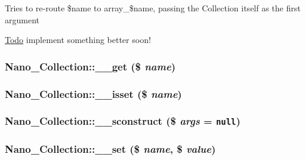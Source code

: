 Tries to re-route \$name to array\_\-\$name, passing the Collection itself as the first argument \begin{Desc}
\item[\hyperlink{todo__todo000002}{Todo}]implement something better soon! \end{Desc}
\hypertarget{classNano__Collection_0fed66ab270585399fffb03d9421b05c}{
\subsubsection[{\_\-\_\-get}]{\setlength{\rightskip}{0pt plus 5cm}Nano\_\-Collection::\_\-\_\-get (\$ {\em name})}}
\label{classNano__Collection_0fed66ab270585399fffb03d9421b05c}


\hypertarget{classNano__Collection_2efb27f0b6f87bd66c33d63988191578}{
\subsubsection[{\_\-\_\-isset}]{\setlength{\rightskip}{0pt plus 5cm}Nano\_\-Collection::\_\-\_\-isset (\$ {\em name})}}
\label{classNano__Collection_2efb27f0b6f87bd66c33d63988191578}


\hypertarget{classNano__Collection_6ce190c316defd206707b186e312bbac}{
\subsubsection[{\_\-\_\-sconstruct}]{\setlength{\rightskip}{0pt plus 5cm}Nano\_\-Collection::\_\-\_\-sconstruct (\$ {\em args} = {\tt null})}}
\label{classNano__Collection_6ce190c316defd206707b186e312bbac}


\hypertarget{classNano__Collection_4e51af85e79344c64f93457ba8676d18}{
\subsubsection[{\_\-\_\-set}]{\setlength{\rightskip}{0pt plus 5cm}Nano\_\-Collection::\_\-\_\-set (\$ {\em name}, \/  \$ {\em value})}}
\label{classNano__Collection_4e51af85e79344c64f93457ba8676d18}


